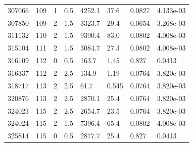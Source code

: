 \documentclass[preview]{standalone}
\begin{document}
{{{{\begin{tabular}{L{1.2cm}C{1.2cm} C{0.3cm}C{0.5cm} C{1.4cm}C{1.4cm} C{1.4cm}C{1.4cm}}
  307066  &   109  & 1     & 0.5 &  4252.1  & 37.6  & 0.0827 &  4.133e-03   \\ 
  307850  &   109  & 2     & 1.5 &  3323.7  & 29.4  & 0.0654 &  3.268e-03   \\ 
  311132  &   110  & 2     & 1.5 &  9390.4  & 83.0  & 0.0802 &  4.008e-03   \\ 
  315104  &   111  & 2     & 1.5 &  3084.7  & 27.3  & 0.0802 &  4.008e-03   \\ 
  316109  &   112  & 0     & 0.5 &  163.7  & 1.45  & 0.827 &  0.0413   \\ 
  316337  &   112  & 2     & 2.5 &  134.9  & 1.19  & 0.0764 &  3.820e-03   \\ 
  318717  &   113  & 2     & 2.5 &  61.7  & 0.545  & 0.0764 &  3.820e-03   \\ 
  320876  &   113  & 2     & 2.5 &  2870.1  & 25.4  & 0.0764 &  3.820e-03   \\ 
  324023  &   115  & 2     & 2.5 &  2654.7  & 23.5  & 0.0764 &  3.820e-03   \\ 
  324024  &   115  & 2     & 1.5 &  7396.4  & 65.4  & 0.0802 &  4.008e-03   \\ 
  325814  &   115  & 0     & 0.5 &  2877.7  & 25.4  & 0.827 &  0.0413   \\ 
\hline 
\end{tabular} 

}}}}
\end{document}
